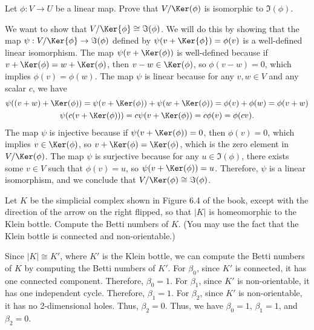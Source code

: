 \renewcommand\S{\mathbb{S}}

\begin{problem}[1]
  Let $\phi : V \to U$ be a linear map. Prove that $V/\Ker(\phi)$ is isomorphic to $\Im(\phi)$.
\end{problem}

\begin{solution}
  We want to show that $V/\Ker{\phi} \cong \Im(\phi)$. We will do this by showing that the map $\psi : V/\Ker{\phi} \to \Im(\phi)$ defined by $\psi(v + \Ker{\phi}) = \phi(v)$ is a well-defined linear isomorphism. The map $\psi(v + \Ker(\phi))$ is well-defined because if $v + \Ker(\phi) = w + \Ker(\phi)$, then $v - w \in \Ker(\phi)$, so $\phi(v - w) = 0$, which implies $\phi(v) = \phi(w)$. The map $\psi$ is linear because for any $v, w \in V$ and any scalar $c$, we have
  \begin{gather*}
    \psi((v + w) + \Ker(\phi)) = \psi(v + \Ker(\phi)) + \psi(w + \Ker(\phi)) = \phi(v) + \phi(w) = \phi(v + w) \\
    \psi(c(v + \Ker(\phi))) = c\psi(v + \Ker(\phi)) = c\phi(v) = \phi(cv)
  .\end{gather*}
  The map $\psi$ is injective because if $\psi(v + \Ker(\phi)) = 0$, then $\phi(v) = 0$, which implies $v \in \Ker(\phi)$, so $v + \Ker(\phi) = \Ker(\phi)$, which is the zero element in $V/\Ker(\phi)$. The map $\psi$ is surjective because for any $u \in \Im(\phi)$, there exists some $v \in V$ such that $\phi(v) = u$, so $\psi(v + \Ker(\phi)) = u$. Therefore, $\psi$ is a linear isomorphism, and we conclude that $V/\Ker(\phi) \cong \Im(\phi)$.
\end{solution}

\begin{problem}[2]
  Let $K$ be the simplicial complex shown in Figure 6.4 of the book, except with the direction of the arrow on the right flipped, so that $|K|$ is homeomorphic to the Klein bottle. Compute the Betti numbers of $K$. (You may use the fact that the Klein bottle is connected and non-orientable.)
\end{problem}

\begin{solution}
  Since $|K| \cong K'$, where $K'$ is the Klein bottle, we can compute the Betti numbers of $K$ by computing the Betti numbers of $K'$. For $\beta_0$, since $K'$ is connected, it has one connected component. Therefore, $\beta_0 = 1$. For $\beta_1$, since $K'$ is non-orientable, it has one independent cycle. Therefore, $\beta_1 = 1$. For $\beta_2$, since $K'$ is non-orientable, it has no 2-dimensional holes. Thus, $\beta_2 = 0$. Thus, we have $\beta_0 = 1$, $\beta_1 = 1$, and $\beta_2 = 0$.
\end{solution}

